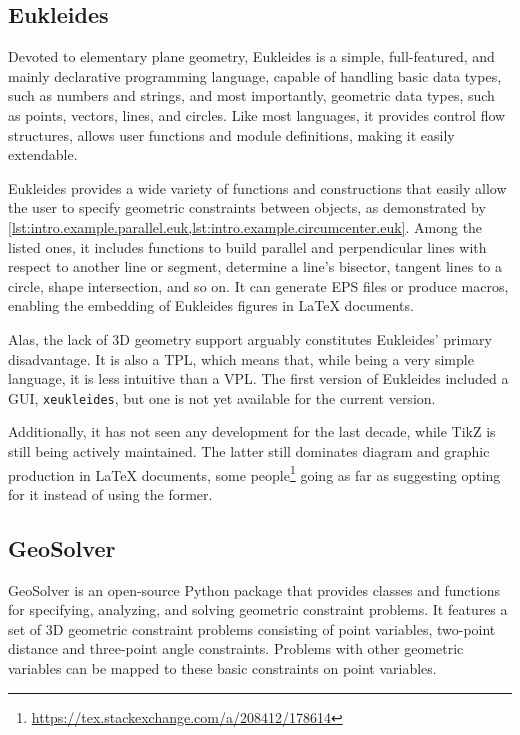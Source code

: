 \subsection{Eukleides}%
\label{sec:related.constraints.eukleides}

Devoted to elementary plane geometry, Eukleides is a simple, full-featured, and
mainly declarative programming language, capable of handling basic data types,
such as numbers and strings, and most importantly, geometric data types, such as
points, vectors, lines, and circles.  Like most languages, it provides control
flow structures, allows user functions and module definitions, making it easily
extendable.

Eukleides provides a wide variety of functions and constructions that easily
allow the user to specify geometric constraints between objects, as demonstrated
by \cref{lst:intro.example.parallel.euk,lst:intro.example.circumcenter.euk}.
Among the listed ones, it includes functions to build parallel and perpendicular
lines with respect to another line or segment, determine a line's bisector,
tangent lines to a circle, shape intersection, and so on.  It can generate
\ac{EPS} files or produce macros, enabling the embedding of Eukleides figures in
\LaTeX{} documents.

Alas, the lack of 3D geometry support arguably constitutes Eukleides' primary
disadvantage.  It is also a \ac{TPL}, which means that, while being a very
simple language, it is less intuitive than a \ac{VPL}.  The first version of
Eukleides included a \ac{GUI}, \texttt{xeukleides}, but one is not yet available
for the current version.

Additionally, it has not seen any development for the last decade, while
\acs{TikZ} is still being actively maintained.  The latter still dominates
diagram and graphic production in \LaTeX{} documents, some
people\footnote{\url{https://tex.stackexchange.com/a/208412/178614}} going as
far as suggesting opting for it instead of using the former.

\subsection{GeoSolver}%
\label{sec:related.constraints.geosolver}

GeoSolver is an open-source Python package that provides classes and functions
for specifying, analyzing, and solving geometric constraint problems.  It
features a set of 3D geometric constraint problems consisting of point
variables, two-point distance and three-point angle constraints.  Problems with
other geometric variables can be mapped to these basic constraints on point
variables.

